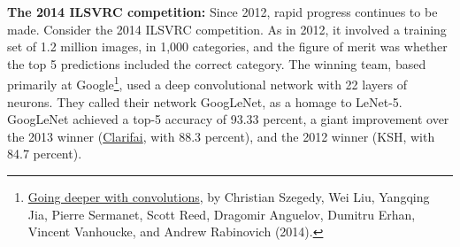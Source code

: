 \documentclass[a4paper,twoside,10pt]{book}
\begin{document}
\textbf{The 2014 ILSVRC competition:} Since 2012, rapid progress continues to be made. Consider the 2014 ILSVRC competition. As in 2012, it involved a training set of 1.2 million images, in 1,000 categories, and the figure of merit was whether the top 5 predictions included the correct category. The winning team, based primarily at Google\footnote{\href{http://arxiv.org/abs/1409.4842}{Going deeper with convolutions}, by Christian Szegedy, Wei Liu, Yangqing Jia, Pierre Sermanet, Scott Reed, Dragomir Anguelov, Dumitru Erhan, Vincent Vanhoucke, and Andrew Rabinovich (2014).}, used a deep convolutional network with 22 layers of neurons. They called their network GoogLeNet, as a homage to LeNet-5. GoogLeNet achieved a top-5 accuracy of 93.33 percent, a giant improvement over the 2013 winner (\href{http://www.clarifai.com/}{Clarifai}, with 88.3 percent), and the 2012 winner (KSH, with 84.7 percent).
\end{document}
